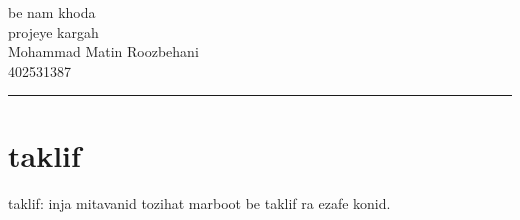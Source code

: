 \documentclass{article}
\begin{document}
\begin{center}
    {\Huge be nam khoda} \\[1cm]
    {\LARGE projeye kargah} \\[0.5cm]
    {\large Mohammad Matin Roozbehani} \\[0.5cm]
    {\large 402531387} \\[1cm]
    \hrule
\end{center}

\vspace{1cm}

\section*{taklif}
taklif: inja mitavanid tozihat marboot be taklif ra ezafe konid.
\end{document}
